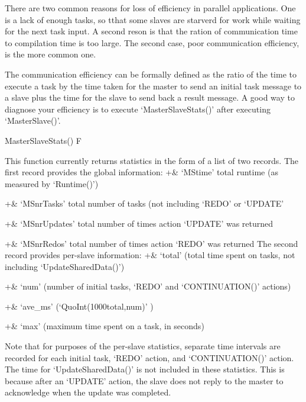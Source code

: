 \label{efficiency}

There are two common reasons for loss of efficiency in parallel
applications.  One is a lack of enough tasks, so tthat some slaves are
starverd for work while waiting for the next task input.  A second
reson is that the ration of communication time to compilation time is
too large.  The second case, poor communication efficiency, is the
more common one.

The communication efficiency can be formally defined as the
ratio of the time to execute a task by the time taken for the master to
send an initial task message to a slave plus the time for the slave to send
back a result message.  A good way to diagnose your efficiency is
to execute `MasterSlaveStats()' after executing `MasterSlave()'.

\>MasterSlaveStats() F

This function currently returns statistics in the form of a list
of two records.  The first record provides the global information:
\beginitems
+& `MStime' total runtime (as measured by `Runtime()')

+& `MSnrTasks' total number of tasks (not including `REDO' or `UPDATE'

+& `MSnrUpdates' total number of times action `UPDATE' was returned

+& `MSnrRedos' total number of times action `REDO' was returned
\enditems
The second record provides per-slave information:
\beginitems
+& `total' (total time spent on tasks, not including `UpdateSharedData()')

+& `num' (number of initial tasks, `REDO' and `CONTINUATION()' actions)

+& `ave_ms' (`QuoInt(1000\*total,num)' )

+& `max' (maximum time spent on a task, in seconds)
\enditems

Note that for purposes of the per-slave statistics, separate time intervals
are recorded for each initial task, `REDO' action, and `CONTINUATION()'
action.  The time for `UpdateSharedData()' is not included in these
statistics.  This is because after an `UPDATE' action, the slave does
not reply to the master to acknowledge when the update was completed.

